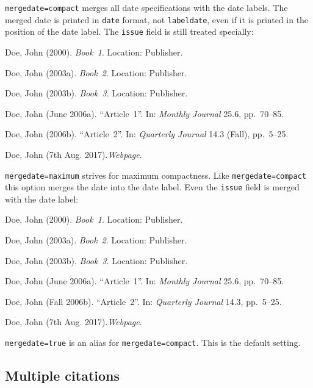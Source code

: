 \documentclass[a4paper]{article}
\newenvironment{bibsample}
  {\trivlist\samepage
   \setlength{\itemsep}{0pt}}
  {\endtrivlist}
\begin{document}
\texttt{mergedate=compact} merges all date specifications with the
date labels. The merged date is printed in \texttt{date} format,
not \texttt{labeldate}, even if it is printed in the position of
the date label. The \texttt{issue} field is still treated specially:

\begin{bibsample}
\item Doe, John (2000). \emph{Book~1}. Location: Publisher.
\item Doe, John (2003a). \emph{Book~2}. Location: Publisher.
\item Doe, John (2003b). \emph{Book~3}. Location: Publisher.
\item Doe, John (June 2006a). \enquote{Article~1}. In: \emph{Monthly Journal} 25.6, pp.~70--85.
\item Doe, John (2006b). \enquote{Article~2}. In: \emph{Quarterly Journal} 14.3
(Fall), pp.~5--25.
\item Doe, John (7th Aug. 2017).\emph{Webpage}.
\end{bibsample}

\texttt{mergedate=maximum} strives for maximum compactness.
Like \texttt{mergedate=compact} this option merges the date
into the date label.
Even the \texttt{issue} field is merged with the date label:

\begin{bibsample}
\item Doe, John (2000). \emph{Book~1}. Location: Publisher.
\item Doe, John (2003a). \emph{Book~2}. Location: Publisher.
\item Doe, John (2003b). \emph{Book~3}. Location: Publisher.
\item Doe, John (June 2006a). \enquote{Article~1}. In: \emph{Monthly Journal} 25.6, pp.~70--85.
\item Doe, John (Fall 2006b). \enquote{Article~2}. In: \emph{Quarterly Journal} 14.3, pp.~5--25.
\item Doe, John (7th Aug. 2017).\emph{Webpage}.
\end{bibsample}

\texttt{mergedate=true} is an alias for \texttt{mergedate=compact}.
This is the default setting.

\subsection*{Multiple citations}

\cite{knuth:ct:c,aristotle:physics,knuth:ct:b,aristotle:poetics,aristotle:rhetoric,knuth:ct:d}

\clearpage
\printbibliography
\end{document}
